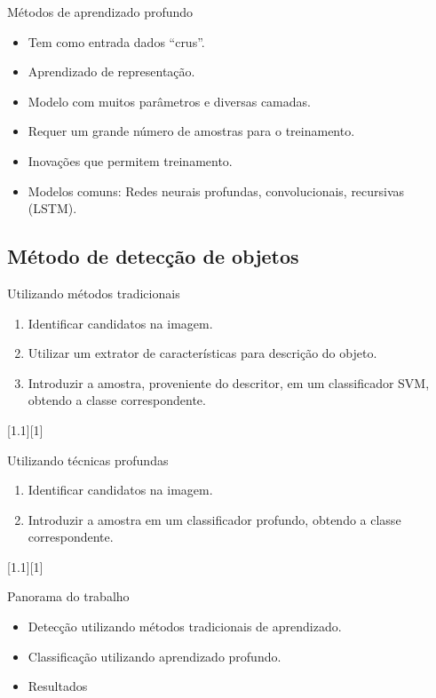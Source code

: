 	\begin{frame}{Métodos de aprendizado profundo}
		\begin{itemize}
			\item Tem como entrada dados ``crus''.
			\item Aprendizado de representação.
			\item Modelo com muitos parâmetros e diversas camadas.
			\item Requer um grande número de amostras para o treinamento.
			\item Inovações que permitem treinamento.
			\item Modelos comuns: Redes neurais profundas, convolucionais, recursivas (LSTM).
		\end{itemize}
	\end{frame}

\subsection{Método de detecção de objetos}
	\begin{frame}{Utilizando métodos tradicionais}
	\begin{enumerate}
	\item Identificar candidatos na imagem.
	\item Utilizar um extrator de características para descrição do objeto.
	\item Introduzir a amostra, proveniente do descritor, em um classificador SVM, obtendo a classe correspondente.
	\end{enumerate}

	[1.1][1]
	\end{frame}

	\begin{frame}{Utilizando técnicas profundas}
	\begin{enumerate}
	\item Identificar candidatos na imagem.
	\item Introduzir a amostra em um classificador profundo, obtendo a classe correspondente.
	\end{enumerate}

	[1.1][1]
	\end{frame}

	\begin{frame}{Panorama do trabalho}
		\begin{itemize}
			\item Detecção utilizando métodos tradicionais de aprendizado.
			\item Classificação utilizando aprendizado profundo.
			\item Resultados
		\end{itemize}
	\end{frame}
